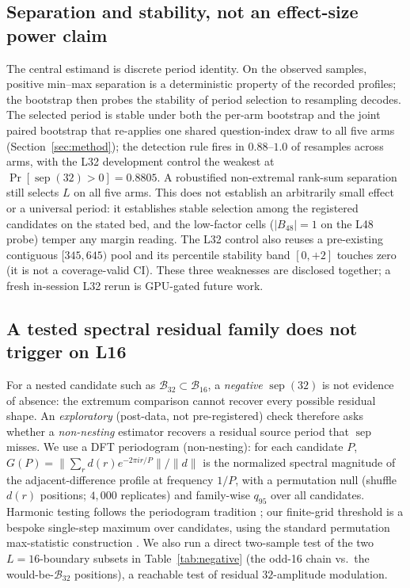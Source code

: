 \documentclass{article}
\begin{document}
\subsection{Separation and stability, not an effect-size power claim}

The central estimand is discrete period identity. On the observed samples,
positive min--max separation is a deterministic property of the recorded profiles;
the bootstrap then probes the stability of period selection to resampling decodes.
The selected period is stable under both the per-arm bootstrap and the joint
paired bootstrap that re-applies one shared question-index draw to all five arms
(Section~\ref{sec:method}); the detection rule fires in $0.88$--$1.0$ of
resamples across arms, with the L32 development control the weakest at
$\Pr[\operatorname{sep}(32){>}0]{=}0.8805$. A robustified non-extremal
rank-sum separation still selects $L$ on all five arms. This does not establish an
arbitrarily small effect or a universal period: it establishes stable selection
among the registered candidates on the stated bed, and the low-factor cells
($|B_{48}|{=}1$ on the L48 probe) temper any margin reading.
The L32 control also reuses a pre-existing contiguous $[345,645)$ pool and its
percentile stability band $[0,+2]$ touches zero (it is not a coverage-valid CI).
These three weaknesses are disclosed together; a fresh in-session L32 rerun is
GPU-gated future work.

\FloatBarrier
\subsection{A tested spectral residual family does not trigger on L16}\label{sec:nonnest}

For a nested candidate such as
$\mathcal B_{32}\subset\mathcal B_{16}$, a \emph{negative}
$\operatorname{sep}(32)$ is not evidence of absence: the extremum comparison
cannot recover every possible residual shape. An \emph{exploratory} (post-data,
not pre-registered) check therefore asks
whether a \emph{non-nesting} estimator recovers a residual source period that
$\operatorname{sep}$ misses. We use a DFT periodogram (non-nesting): for each
candidate $P$, $G(P)=\lVert\sum_r d(r)e^{-2\pi i r/P}\rVert/\lVert d\rVert$ is the
normalized spectral magnitude of the adjacent-difference profile at frequency
$1/P$, with a permutation null (shuffle $d(r)$ positions; $4{,}000$ replicates)
and family-wise $q_\mathrm{95}$ over all candidates. Harmonic testing follows
the periodogram tradition \citep{fisher1929harmonic}; our finite-grid threshold
is a bespoke single-step maximum over candidates, using the standard permutation
max-statistic construction \citep{nichols2002permutation}. We also run a direct
two-sample test of the two $L{=}16$-boundary subsets in
Table~\ref{tab:negative} (the odd-16 chain vs.\ the would-be-$\mathcal B_{32}$
positions), a reachable test of residual $32$-amplitude modulation.
\end{document}
